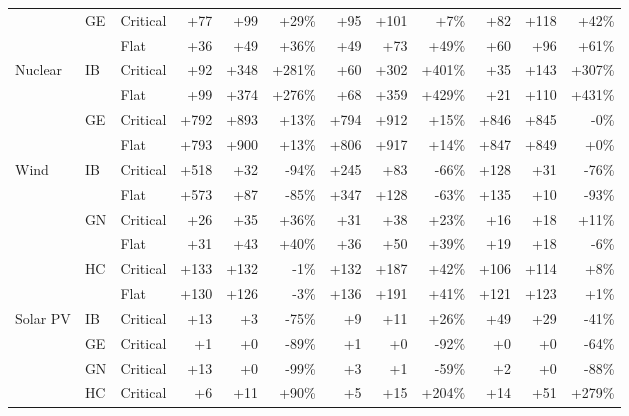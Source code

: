 \begin{tabular}{l l l r r r r r r r r r }
 & GE & Critical & +77 & +99 & +29\% & +95 & +101 & +7\% & +82 & +118 & +42\% \\
 &  & Flat & +36 & +49 & +36\% & +49 & +73 & +49\% & +60 & +96 & +61\% \\
\addlinespace
Nuclear & IB & Critical & +92 & +348 & +281\% & +60 & +302 & +401\% & +35 & +143 & +307\% \\
 &  & Flat & +99 & +374 & +276\% & +68 & +359 & +429\% & +21 & +110 & +431\% \\
 & GE & Critical & +792 & +893 & +13\% & +794 & +912 & +15\% & +846 & +845 & -0\% \\
 &  & Flat & +793 & +900 & +13\% & +806 & +917 & +14\% & +847 & +849 & +0\% \\
\addlinespace
Wind & IB & Critical & +518 & +32 & -94\% & +245 & +83 & -66\% & +128 & +31 & -76\% \\
 &  & Flat & +573 & +87 & -85\% & +347 & +128 & -63\% & +135 & +10 & -93\% \\
 & GN & Critical & +26 & +35 & +36\% & +31 & +38 & +23\% & +16 & +18 & +11\% \\
 &  & Flat & +31 & +43 & +40\% & +36 & +50 & +39\% & +19 & +18 & -6\% \\
 & HC & Critical & +133 & +132 & -1\% & +132 & +187 & +42\% & +106 & +114 & +8\% \\
 &  & Flat & +130 & +126 & -3\% & +136 & +191 & +41\% & +121 & +123 & +1\% \\
\addlinespace
Solar PV & IB & Critical & +13 & +3 & -75\% & +9 & +11 & +26\% & +49 & +29 & -41\% \\
 & GE & Critical & +1 & +0 & -89\% & +1 & +0 & -92\% & +0 & +0 & -64\% \\
 & GN & Critical & +13 & +0 & -99\% & +3 & +1 & -59\% & +2 & +0 & -88\% \\
 & HC & Critical & +6 & +11 & +90\% & +5 & +15 & +204\% & +14 & +51 & +279\% \\
\bottomrule
\end{tabular}